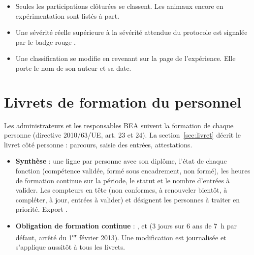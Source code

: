 \documentclass[11pt,a4paper]{article}
\begin{document}
\begin{regle}
\begin{itemize}
  \item Seules les participations clôturées se classent. Les animaux encore
    en expérimentation sont listés à part.
  \item Une sévérité réelle supérieure à la sévérité attendue du protocole
    est signalée par le badge rouge .
  \item Une classification se modifie en revenant sur la page de
    l'expérience. Elle porte le nom de son auteur et sa date.
\end{itemize}
\end{regle}

\section{Livrets de formation du personnel}\label{sec:livrets}
Les administrateurs et les responsables BEA suivent la formation de chaque
personne (directive 2010/63/UE, art. 23 et 24). La section~\ref{sec:livret} décrit
le livret côté personne : parcours, saisie des entrées, attestations.


\begin{itemize}
  \item \textbf{Synthèse} : une ligne par personne avec son diplôme, l'état
    de chaque fonction (compétence validée, formé sous encadrement, non
    formé), les heures de formation continue sur la période, le statut et
    le nombre d'entrées à valider. Les compteurs en tête (non conformes, à
    renouveler bientôt, à compléter, à jour, entrées à valider) et
     désignent les personnes à
    traiter en priorité. Export .
  \item \textbf{Obligation de formation continue} : ,
     et  (3 jours sur
    6 ans de 7~h par défaut, arrêté du 1\textsuperscript{er} février 2013).
    Une modification est journalisée et s'applique aussitôt à tous les
    livrets.
\end{itemize}
\end{document}
